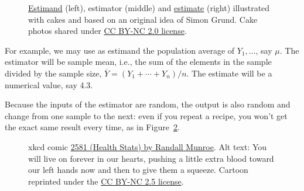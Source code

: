 \documentclass[
  11pt,
  letterpaper,
]{scrbook}
\theoremstyle{definition}
\theoremstyle{definition}
\theoremstyle{remark}
\begin{document}
\begin{figure}[ht!]

\begin{minipage}{0.33\linewidth}



\end{minipage}%
%
\begin{minipage}{0.33\linewidth}



\end{minipage}%
%
\begin{minipage}{0.33\linewidth}



\end{minipage}%

\caption{\label{fig-cake}\href{https://www.flickr.com/photos/darkdwarf/16563489881}{Estimand}
(left), estimator (middle) and
\href{https://www.flickr.com/photos/bensutherland/14685548773}{estimate}
(right) illustrated with cakes and based on an original idea of Simon
Grund. Cake photos shared under
\href{https://creativecommons.org/licenses/by-nc/2.0/}{CC BY-NC 2.0
license}.}

\end{figure}%

For example, we may use as estimand the population average of
\(Y_1, \ldots\), say \(\mu\). The estimator will be sample mean, i.e.,
the sum of the elements in the sample divided by the sample size,
\(\overline{Y}=(Y_1 + \cdots + Y_n)/n\). The estimate will be a
numerical value, say 4.3.

Because the inputs of the estimator are random, the output is also
random and change from one sample to the next: even if you repeat a
recipe, you won't get the exact same result every time, as in
Figure~\ref{fig-xkcd605}.

\begin{figure}[ht!]


\caption{\label{fig-xkcd605}xkcd comic
\href{https://xkcd.com/2581/}{2581 (Health Stats) by Randall Munroe}.
Alt text: You will live on forever in our hearts, pushing a little extra
blood toward our left hands now and then to give them a squeeze. Cartoon
reprinted under the
\href{https://creativecommons.org/licenses/by-nc/2.5/}{CC BY-NC 2.5
license}.}

\end{figure}%
\end{document}
